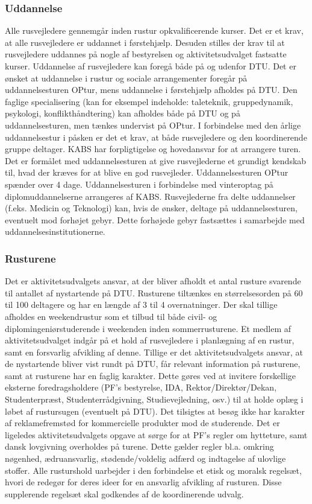 \subsubsection{Uddannelse}
Alle rusvejledere gennemgår inden rustur opkvalificerende kurser. Det er et krav, at alle rusvejledere er uddannet i førstehjælp. Desuden stilles der krav til at rusvejledere uddannes på nogle af bestyrelsen og aktivitetsudvalget fastsatte kurser. Uddannelse af rusvejledere kan foregå både på og udenfor DTU. Det er ønsket at uddannelse i rustur og sociale arrangementer foregår på uddannelsesturen OPtur, mens uddannelse i førstehjælp afholdes på DTU. Den faglige specialisering (kan for eksempel indeholde: taleteknik, gruppedynamik, psykologi, konflikthåndtering) kan afholdes både på DTU og på uddannelsesturen, men tænkes undervist på OPtur. I forbindelse med den årlige uddannelsestur i påsken er det et krav, at både rusvejledere og den koordinerende gruppe deltager. KABS har forpligtigelse og hovedansvar for at arrangere turen.\\

Det er formålet med uddannelsesturen at give rusvejlederne et grundigt kendskab til, hvad der kræves for at blive en god rusvejleder. Uddannelsesturen OPtur spænder over 4 dage. Uddannelsesturen i forbindelse med vinteroptag på diplomuddannelserne arrangeres af KABS. Rusvejlederne fra delte uddannelser (f.eks. Medicin og Teknologi) kan, hvis de ønsker, deltage på uddannelsesturen, eventuelt mod forhøjet gebyr. Dette forhøjede gebyr fastsættes i samarbejde med uddannelsesinstitutionerne.

\subsubsection{Rusturene}
Det er aktivitetsudvalgets ansvar, at der bliver afholdt et antal rusture svarende til antallet af nystartende på DTU. Rusturene tiltænkes en størrelsesorden på 60 til 100 deltagere og har en længde af 3 til 4 overnatninger. Der skal tillige afholdes en weekendrustur som et tilbud til både civil- og diplomingeniørstuderende i weekenden inden sommerrusturene. Et medlem af aktivitetsudvalget indgår på et hold af rusvejledere i planlægning af en rustur, samt en forsvarlig afvikling af denne. Tillige er det aktivitetsudvalgets ansvar, at de nystartende bliver vist rundt på DTU, får relevant information på rusturene, samt at rusturene har en faglig karakter. Dette gøres ved at invitere forskellige eksterne foredragsholdere (PF’s bestyrelse, IDA, Rektor/Direktør/Dekan, Studenterpræst, Studenterrådgivning, Studievejledning, osv.) til at holde oplæg i løbet af rustursugen (eventuelt på DTU). Det tilsigtes at besøg ikke har karakter af reklamefremstød for kommercielle produkter mod de studerende. Det er ligeledes aktivitetsudvalgets opgave at sørge for at PF’s regler om hytteture, samt dansk lovgivning overholdes på turene. Dette gælder regler bl.a. omkring nøgenhed, ædruansvarlig, stødende/voldelig adfærd og indtagelse af ulovlige stoffer. Alle rusturshold uarbejder i den forbindelse et etisk og moralsk regelsæt, hvori de redegør for deres ideer for en ansvarlig afvikling af rusturen. Disse supplerende regelsæt skal godkendes af de koordinerende udvalg.\\

